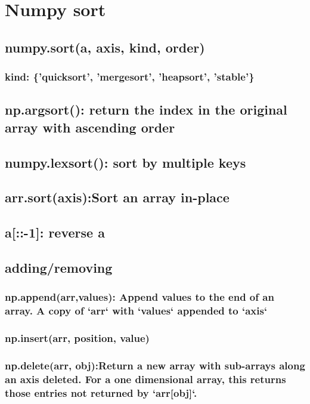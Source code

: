 \documentclass[11pt]{article}
\begin{document}
\section{Numpy sort}
\label{sec:orga77a448}
\subsection{numpy.sort(a, axis, kind, order)}
\label{sec:org165b273}
\subsubsection{kind: \{'quicksort', 'mergesort', 'heapsort', 'stable'\}}
\label{sec:org6c10bd4}
\subsection{np.argsort(): return the index in the original array with ascending order}
\label{sec:org170cbf3}
\subsection{numpy.lexsort(): sort by multiple keys}
\label{sec:orgb9d712e}
\subsection{}
\label{sec:org0266c30}
\subsection{arr.sort(axis):Sort an array in-place}
\label{sec:orgc4a75fb}
\subsection{a[::-1]: reverse a}
\label{sec:org03c11f3}
\subsection{adding/removing}
\label{sec:orgf730f77}
\subsubsection{np.append(arr,values): Append values to the end of an array. A copy of `arr` with `values` appended to `axis`}
\label{sec:org6448330}
\subsubsection{np.insert(arr, position, value)}
\label{sec:org5b3f2d5}
\subsubsection{np.delete(arr, obj):Return a new array with sub-arrays along an axis deleted. For a one dimensional array, this returns those entries not returned by `arr[obj]`.}
\label{sec:org0ec4a28}
\end{document}
